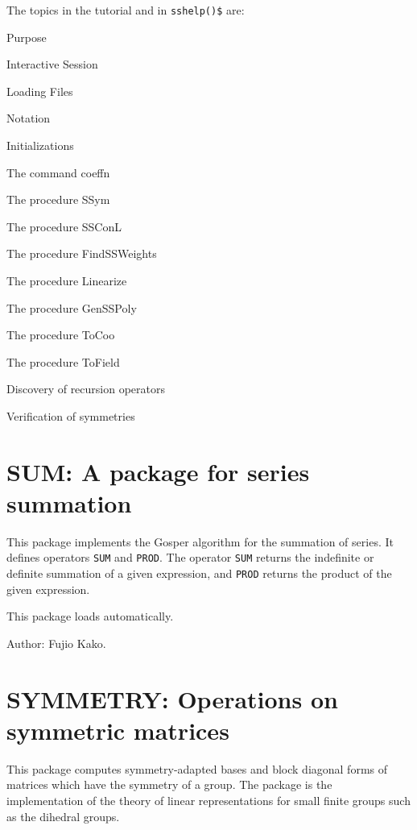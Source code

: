 The topics in the tutorial and in \texttt{sshelp()\$} are:
\begin{description}
\item{Purpose}
\item{Interactive Session}
\item{Loading Files}
\item{Notation}
\item{Initializations}
\item{The command coeffn}
\item{The procedure SSym}
\item{The procedure SSConL}
\item{The procedure FindSSWeights}
\item{The procedure Linearize}
\item{The procedure GenSSPoly}
\item{The procedure ToCoo}
\item{The procedure ToField}
\item{Discovery of recursion operators}
\item{Verification of symmetries}
\end{description}



\newpage

\section{SUM: A package for series summation}
\hypertarget{operator:SUM}{}
\hypertarget{operator:PROD}{}

This package implements the Gosper algorithm for the summation of series.
It defines operators {\tt SUM} and {\tt PROD}.  The operator {\tt SUM}
returns the indefinite or definite summation of a given expression, and
{\tt PROD} returns the product of the given expression.

This package loads automatically.

Author: Fujio Kako.



\newpage

\section{SYMMETRY: Operations on symmetric matrices}

This package computes symmetry-adapted bases and block diagonal forms of
matrices which have the symmetry of a group.  The package is the
implementation of the theory of linear representations for small finite
groups such as the dihedral groups.

